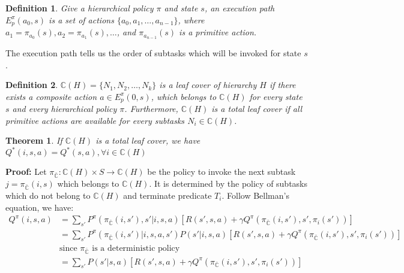 \documentclass{article} %
\newtheorem{definition}{Definition}
\newtheorem{theorem}{Theorem}
\begin{document}
\begin{definition}
    Give a hierarchical policy $\pi$ and state $s$, an execution path $E_p^\pi(a_0, s)$ 
    is a set of actions $\{a_0, a_1, \dots, a_{n-1}\}$, where $a_1=\pi_{a_0}(s), a_2=\pi_{a_1}(s), \dots$,
    and $\pi_{a_{n-1}}(s)$ is a primitive action.
\end{definition}
The execution path tells us the order of subtasks which will be invoked for state $s$.


\begin{definition}
    $\mathbb{C}(H) = \{N_1, N_2, \dots, N_k\}$ is a leaf cover of hierarchy $H$ if 
    there exists a composite action $a \in E_p^{\pi}(0, s)$, which belongs to $\mathbb{C}(H)$ for every
    state $s$ and every hierarchical policy $\pi$.
    Furthermore, $\mathbb{C}(H)$ is a total leaf cover if all primitive actions are available for every 
    subtasks $N_i \in \mathbb{C}(H)$.
\end{definition}



\begin{theorem}
    If $\mathbb{C}(H)$ is a total leaf cover, we have $Q^*(i, s, a) = Q^*(s, a), \forall i \in \mathbb{C}(H)$
\end{theorem}
\textbf{Proof:} Let $\pi_{\bar{\mathbb{C}}}: \mathbb{C}(H) \times S \rightarrow \mathbb{C}(H)$ be the policy to invoke
the next subtask $j = \pi_{\bar{\mathbb{C}}}(i, s)$ which belongs to $\mathbb{C}(H)$. It is determined
by the policy of subtasks which do not belong to $\mathbb{C}(H)$ and terminate predicate $T_i$. Follow Bellman's equation, we have:
\begin{align}
    Q^{\pi}(i, s, a) &= \sum_{s'} P^{\pi}(\pi_{\bar{\mathbb{C}}}(i, s'), s'|i, s, a) [R(s', s, a) + \gamma Q^{\pi}(\pi_{\bar{\mathbb{C}}}(i, s'), s', \pi_i(s'))]\\
    &=\sum_{s'}P^{\pi}(\pi_{\bar{\mathbb{C}}}(i, s')| i, s, a, s') P(s' | i, s, a)  [R(s', s, a) + \gamma Q^{\pi}(\pi_{\bar{\mathbb{C}}}(i, s'), s', \pi_i(s'))]\\
    &\mbox{since $\pi_{\bar{\mathbb{C}}}$ is a deterministic policy}\\
    &=\sum_{s'} P(s' | s, a) [R(s', s, a) + \gamma Q^{\pi}(\pi_{\bar{\mathbb{C}}}(i, s'), s', \pi_i(s'))]
    \label{eq:MaxIrr}
\end{align}
\end{document}
